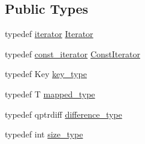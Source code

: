 \subsection*{Public Types}
\begin{DoxyCompactItemize}
\item 
typedef \hyperlink{class_q_map_1_1iterator}{iterator} \hyperlink{class_q_map_a1e3d75b555f8e9c0f8cf4043d179e15c}{Iterator}
\item 
typedef \hyperlink{class_q_map_1_1const__iterator}{const\+\_\+iterator} \hyperlink{class_q_map_ae0df3c69b27f3a8ceeab8244a59477ff}{Const\+Iterator}
\item 
typedef Key \hyperlink{class_q_map_aefd494f0aa5fde13a2740aa83ae33386}{key\+\_\+type}
\item 
typedef T \hyperlink{class_q_map_a8d473df53a41e0a8fb1f4490951b6f43}{mapped\+\_\+type}
\item 
typedef qptrdiff \hyperlink{class_q_map_a5f2bff0c8014b0b8142982d17728d0ca}{difference\+\_\+type}
\item 
typedef int \hyperlink{class_q_map_a6c8551f9c925b9e5dc73129fc1609c90}{size\+\_\+type}
\end{DoxyCompactItemize}
